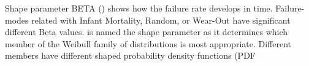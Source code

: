 \begin{frame}
Shape parameter
BETA () shows how the failure rate develops in time. Failure-modes related with Infant Mortality, Random, or Wear-Out have significant different Beta values. is named the shape parameter as it determines which member of the Weibull family of distributions 
is most appropriate. 
Different members have 
different shaped probability 
density functions (PDF
\end{frame}



